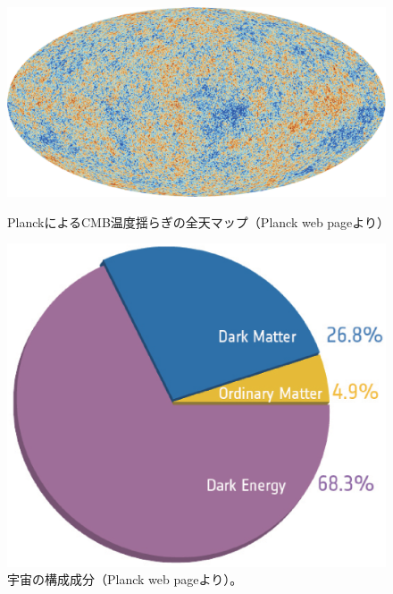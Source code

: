 \begin{figure}[t]
 \begin{minipage}{0.6\hsize}
 \begin{center}
   \vspace{15pt}
   \includegraphics[width=0.7\linewidth]{cosmology/Planck_CMB_Mollweide_4k_2.eps} 
   \vspace{10pt}
   \caption{PlanckによるCMB温度揺らぎの全天マップ（Planck web pageより）}\label{fig:Planck_CMB}
 \end{center}
 \end{minipage}
 \begin{minipage}{0.4\hsize}
 \begin{center}
   \includegraphics[width=0.8\linewidth]{cosmology/component_univ.eps} 
  \vspace{-15pt}
  \caption{宇宙の構成成分（Planck web pageより）。}\label{fig:component}  
 \end{center}
 \end{minipage}
\end{figure}

